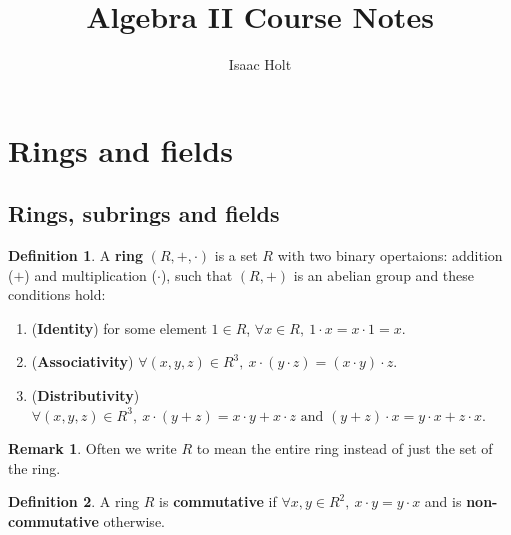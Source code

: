 \documentclass[12pt,a4paper]{article}
\title{Algebra II Course Notes}
\author{Isaac Holt}
\theoremstyle{definition}
\newtheorem{definition}{Definition}[subsection]
\newtheorem*{remark}{Remark}
\begin{document}
\maketitle

\section{Rings and fields}

\subsection{Rings, subrings and fields}

\begin{definition}
	A \textbf{ring} $(R, +, \cdot)$ is a set $R$ with two binary opertaions: addition ($+$) and multiplication ($\cdot$), such that $(R, +)$ is an abelian group and these conditions hold:
	\begin{enumerate}
		\item (\textbf{Identity}) for some element $1 \in R$, $\forall x \in R, \ 1 \cdot x = x \cdot 1 = x$.
		\item (\textbf{Associativity}) $\forall (x, y, z) \in R^3, \ x \cdot (y \cdot z) = (x \cdot y) \cdot z$.
		\item (\textbf{Distributivity}) $\forall (x, y, z) \in R^3, \ x \cdot (y + z) = x \cdot y + x \cdot z \text{ and } (y + z) \cdot x = y \cdot x + z \cdot x$. 
	\end{enumerate}
\end{definition}

\begin{remark}
	Often we write $R$ to mean the entire ring instead of just the set of the ring.
\end{remark}

\begin{definition}
	A ring $R$ is \textbf{commutative} if $\forall x, y \in R^2, \ x \cdot y = y \cdot x$ and is \textbf{non-commutative} otherwise.
\end{definition}
\end{document}
